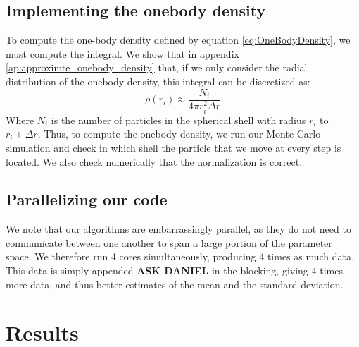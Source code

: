 \documentclass[a4paper, 10pt]{article}
\begin{document}
	\subsection{Implementing the onebody density}\label{sec:MetOneBody}
	To compute the one-body density defined by equation \ref{eq:OneBodyDensity}, we must compute the integral. We show that in appendix \ref{ap:approximte_onebody_density} that, if we only consider the radial distribution of the onebody density, this integral can be discretized as:
	\begin{equation}
		\rho(r_i)\approx \frac{N_i}{4\pi r_i^2 \Delta r}
		\end{equation}
		Where $N_i$ is the number of particles in the spherical shell with radius $r_i$ to $r_i+\Delta r$. Thus, to compute the onebody density, we run our Monte Carlo simulation and check in which shell the particle that we move at every step is located. We also check numerically that the normalization is correct.
	\subsection{Parallelizing our code}
	We note that our algorithms are embarrassingly parallel, as they do not need to communicate between one another to span a large portion of the parameter space. We therefore run 4 cores simultaneously, producing 4 times as much data. This data is simply appended \textbf{ASK DANIEL} in the blocking, giving $4$ times more data, and thus better estimates of the mean and the standard deviation.
	\section{Results}
\end{document}
